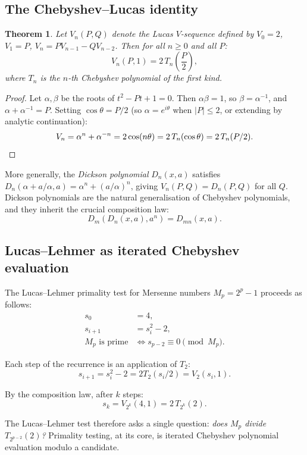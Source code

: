 \documentclass[11pt,a4paper]{article}
\newtheorem{theorem}{Theorem}
\begin{document}
\subsection{The Chebyshev--Lucas identity}

\begin{theorem}\label{thm:lucas}
Let $V_n(P, Q)$ denote the Lucas $V$-sequence defined by $V_0 = 2$, $V_1 = P$, $V_n = PV_{n-1} - QV_{n-2}$. Then for all $n \geq 0$ and all $P$:
\[
    V_n(P, 1) = 2 \, T_n\!\left(\frac{P}{2}\right),
\]
where $T_n$ is the $n$-th Chebyshev polynomial of the first kind.
\end{theorem}

\begin{proof}
Let $\alpha, \beta$ be the roots of $t^2 - Pt + 1 = 0$. Then $\alpha\beta = 1$, so $\beta = \alpha^{-1}$, and $\alpha + \alpha^{-1} = P$. Setting $\cos\theta = P/2$ (so $\alpha = e^{i\theta}$ when $|P| \leq 2$, or extending by analytic continuation):
\[
    V_n = \alpha^n + \alpha^{-n} = 2\cos(n\theta) = 2\,T_n(\cos\theta) = 2\,T_n(P/2). \qedhere
\]
\end{proof}

More generally, the \emph{Dickson polynomial} $D_n(x, a)$ satisfies $D_n(\alpha + a/\alpha, a) = \alpha^n + (a/\alpha)^n$, giving $V_n(P, Q) = D_n(P, Q)$ for all $Q$. Dickson polynomials are the natural generalisation of Chebyshev polynomials, and they inherit the crucial composition law:
\[
    D_m(D_n(x, a), a^n) = D_{mn}(x, a).
\]

\subsection{Lucas--Lehmer as iterated Chebyshev evaluation}

The Lucas--Lehmer primality test for Mersenne numbers $M_p = 2^p - 1$ proceeds as follows:
\begin{align*}
    s_0 &= 4, \\
    s_{i+1} &= s_i^2 - 2, \\
    M_p \text{ is prime} &\iff s_{p-2} \equiv 0 \pmod{M_p}.
\end{align*}

Each step of the recurrence is an application of $T_2$:
\[
    s_{i+1} = s_i^2 - 2 = 2T_2(s_i/2) = V_2(s_i, 1).
\]

By the composition law, after $k$ steps:
\[
    s_k = V_{2^k}(4, 1) = 2\,T_{2^k}(2).
\]

The Lucas--Lehmer test therefore asks a single question: \emph{does $M_p$ divide $T_{2^{p-2}}(2)$?} Primality testing, at its core, is iterated Chebyshev polynomial evaluation modulo a candidate.
\end{document}
